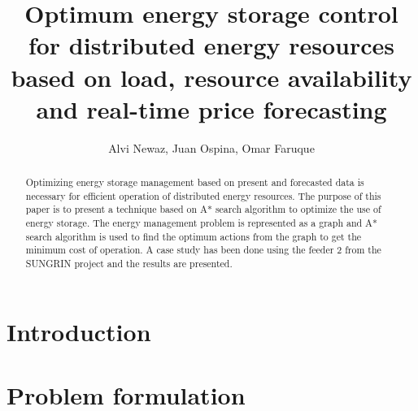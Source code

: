 \documentclass[journal]{IEEEtran}
\begin{document}
\title{Optimum energy storage control for distributed energy resources based on load, resource availability and real-time price forecasting }

\author{Alvi Newaz, Juan Ospina, Omar Faruque}






\maketitle


\begin{abstract}
Optimizing energy storage management based on present and forecasted data is necessary for efficient operation of distributed energy resources. The purpose of this paper is to present a technique based on A* search algorithm to optimize the use of energy storage. The energy management problem is represented as a graph and A* search algorithm is used to find the optimum actions from the graph to get the minimum cost of operation. A case study has been done using the feeder 2 from the SUNGRIN project \cite{SUNGRIN} and the results are presented.


\end{abstract}



\IEEEpeerreviewmaketitle



\section{Introduction}


\section{Problem formulation}





%







\ifCLASSOPTIONcaptionsoff
  \newpage
\fi
\end{document}
